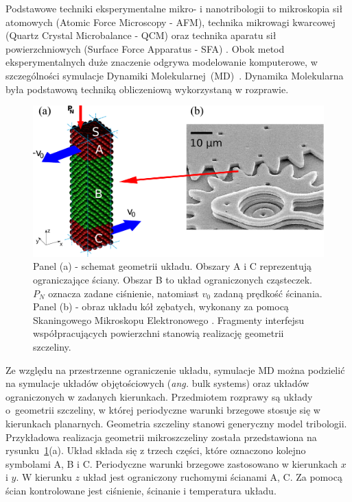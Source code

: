 \documentclass[12pt,a4paper,openright]{report} %
\begin{document}
Podstawowe techniki eksperymentalne mikro- i nanotribologii to mikroskopia sił atomowych (Atomic Force Microscopy - AFM), technika mikrowagi kwarcowej \linebreak (Quartz Crystal Microbalance - QCM) oraz technika aparatu sił powierzchniowych \linebreak (Surface Force Apparatus - SFA) \cite{Krim2002, SpringerHandbook}. Obok metod eksperymentalnych duże znaczenie odgrywa modelowanie komputerowe, w szczególności symulacje Dynamiki Molekularnej~(MD)~\cite{SpringerHandbook, Martini2013, Vanossi2013}. 
Dynamika Molekularna była podstawową techniką obliczeniową wykorzystaną w rozprawie.
\begin{figure}[h!]
\centering
\includegraphics[width=14cm, clip]{rysunki/system_ABC}
\caption{Panel (a) - schemat geometrii układu. Obszary A i C reprezentują ograniczające ściany. Obszar B to układ ograniczonych cząsteczek. $P_N$ oznacza zadane ciśnienie, natomiast $v_0$ zadaną prędkość ścinania. Panel (b) - obraz układu kół zębatych, wykonany za pomocą Skaningowego Mikroskopu Elektronowego \cite{mems_photo}. Fragmenty interfejsu współpracujących powierzchni stanowią realizację geometrii szczeliny.}
\label{system_ABC}
\end{figure}
Ze względu na przestrzenne ograniczenie układu, symulacje MD można podzielić na symulacje układów objętościowych (\textit{ang.} bulk systems) oraz układów ograniczonych w zadanych kierunkach. Przedmiotem rozprawy są układy o~geometrii szczeliny, w której periodyczne warunki brzegowe stosuje się w kierunkach planarnych. Geometria szczeliny stanowi generyczny model tribologii.
Przykładowa realizacja geometrii mikroszczeliny została przedstawiona na rysunku~\ref{system_ABC}(a). Układ składa się z trzech części, które oznaczono kolejno symbolami A, B i C. Periodyczne warunki brzegowe zastosowano w kierunkach $x$ i $y$. W kierunku $z$ układ jest ograniczony ruchomymi ścianami A, C. Za pomocą ścian kontrolowane jest ciśnienie, ścinanie i temperatura układu.
\end{document}
